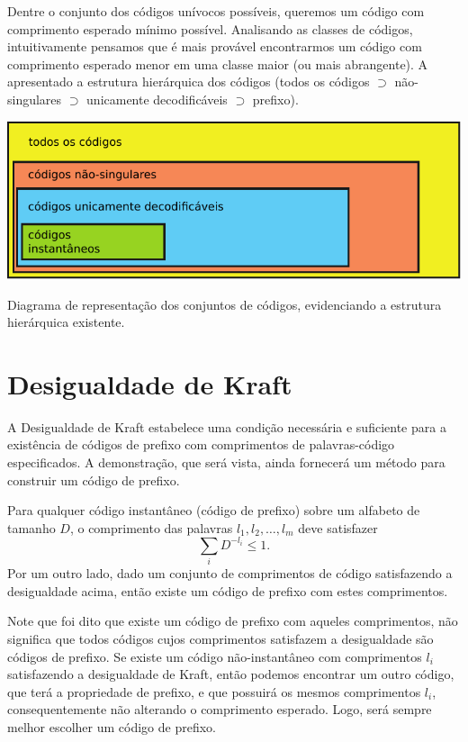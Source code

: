 Dentre o conjunto dos códigos unívocos possíveis, queremos um código com
comprimento esperado mínimo possível. Analisando as classes de códigos,
intuitivamente pensamos que é mais provável encontrarmos um código com
comprimento esperado menor em uma classe maior (ou mais abrangente). 
A  apresentado a estrutura hierárquica dos códigos
(todos os códigos $\supset$ não-singulares $\supset$ unicamente decodificáveis $\supset$ prefixo).

\begin{marginfigure}%
  \includegraphics[width=\linewidth]{figures/tiposcodigos.pdf}
  \caption{Diagrama de representação dos conjuntos de códigos, evidenciando a estrutura hierárquica existente.}\label{fig:tiposcodigos}
\end{marginfigure}




\section{Desigualdade de Kraft}

A Desigualdade de Kraft estabelece uma condição necessária e suficiente para a
existência de códigos de prefixo com comprimentos de palavras-código
especificados. A demonstração, que será vista, ainda fornecerá um método para
construir um código de prefixo.

\begin{theorem}\label{thm:deskraft}
Para qualquer código instantâneo (código de prefixo) sobre um alfabeto de tamanho $D$, o comprimento
das palavras $l_1, l_2, \ldots, l_m$ deve satisfazer
   \begin{equation}\label{eq:desigualdadekraft}
      \sum_i D^{-l_i} \leq 1 .
   \end{equation}
Por um outro lado, dado um conjunto de comprimentos de código satisfazendo a desigualdade acima,
então existe um código de prefixo com estes comprimentos.
\end{theorem}

Note que foi dito que existe um código de prefixo com aqueles comprimentos, não
significa que todos códigos cujos comprimentos satisfazem a desigualdade são
códigos de prefixo. Se existe um código não-instantâneo com comprimentos $l_i$
satisfazendo a desigualdade de Kraft, então podemos encontrar um outro código,
que terá a propriedade de prefixo, e que possuirá os mesmos comprimentos $l_i$,
consequentemente não alterando o comprimento esperado. Logo, será sempre melhor
escolher um código de prefixo.


